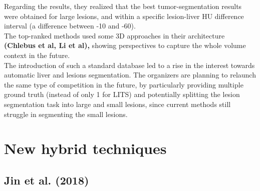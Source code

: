 Regarding the results, they realized that the best tumor-segmentation
results were obtained for large lesions, and within a specific
lesion-liver HU difference interval (a difference between -10 and -60).\\
The top-ranked methods used some 3D approaches in their architecture
\textbf{(Chlebus et al, Li et al),} showing perspectives to capture the
whole volume context in the future.\\
The introduction of such a standard database led to a rise in the
interest towards automatic liver and lesions segmentation. The
organizers are planning to relaunch the same type of competition in the
future, by particularly providing multiple ground truth (instead of only
1 for LITS) and potentially splitting the lesion segmentation task into
large and small lesions, since current methods still struggle in
segmenting the small lesions.

\section{New hybrid techniques}\label{new-hybrid-techniques}

\subsection*{Jin et al. (2018)}\label{jin-et-al.-2018}

